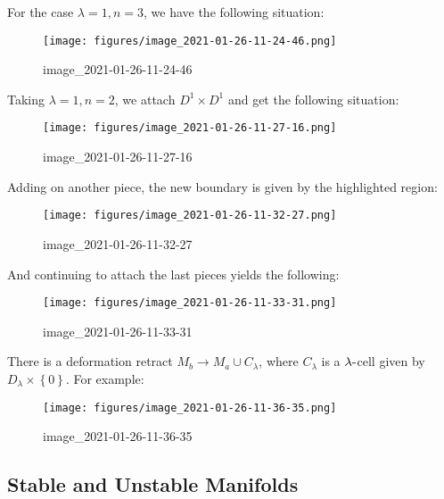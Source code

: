 \begin{example}[?]

For the case \(\lambda= 1, n = 3\), we have the following situation:

\begin{figure}
\centering
\texttt{[image: figures/image\_2021-01-26-11-24-46.png]}
\caption{image\_2021-01-26-11-24-46}
\end{figure}

\end{example}

\begin{example}[?]

Taking \(\lambda=1, n=2\), we attach \(D^1 \times D^1\) and get the
following situation:

\begin{figure}
\centering
\texttt{[image: figures/image\_2021-01-26-11-27-16.png]}
\caption{image\_2021-01-26-11-27-16}
\end{figure}

Adding on another piece, the new boundary is given by the highlighted
region:

\begin{figure}
\centering
\texttt{[image: figures/image\_2021-01-26-11-32-27.png]}
\caption{image\_2021-01-26-11-32-27}
\end{figure}

And continuing to attach the last pieces yields the following:

\begin{figure}
\centering
\texttt{[image: figures/image\_2021-01-26-11-33-31.png]}
\caption{image\_2021-01-26-11-33-31}
\end{figure}

\end{example}

\begin{remark}

There is a deformation retract \(M_b \to M_a \cup C_ \lambda\), where
\(C_ \lambda\) is a \(\lambda{\hbox{-}}\)cell given by
\(D_ \lambda \times\left\{{0}\right\}\). For example:

\begin{figure}
\centering
\texttt{[image: figures/image\_2021-01-26-11-36-35.png]}
\caption{image\_2021-01-26-11-36-35}
\end{figure}

\end{remark}

\hypertarget{stable-and-unstable-manifolds}{%
\subsection{Stable and Unstable
Manifolds}\label{stable-and-unstable-manifolds}}

